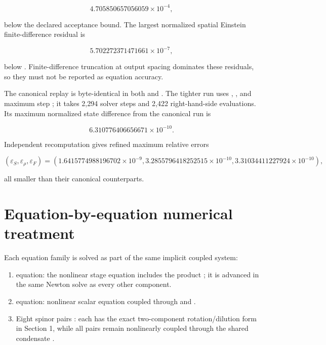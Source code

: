 \documentclass[11pt]{article}
\begin{document}
\[
4.705850657056059\times10^{-4},
\]

below the declared \texttt{} acceptance bound. The largest normalized spatial Einstein finite-difference residual is

\[
5.702272371471661\times10^{-7},
\]

below \texttt{}. Finite-difference truncation at output spacing \texttt{} dominates these residuals, so they must not be reported as \texttt{} equation accuracy.

The canonical replay is byte-identical in both \texttt{} and \texttt{}. The tighter run uses \texttt{}, \texttt{}, and maximum step \texttt{}; it takes 2,294 solver steps and 2,422 right-hand-side evaluations. Its maximum normalized state difference from the canonical run is

\[
6.310776406656671\times10^{-10}.
\]

Independent recomputation gives refined maximum relative errors

\[
(\varepsilon_S,\varepsilon_\rho,\varepsilon_F)
=(1.6415774988196702\times10^{-9},
3.2855796418252515\times10^{-10},
3.31034411227924\times10^{-10}),
\]

all smaller than their canonical counterparts.

\section{Equation-by-equation numerical treatment}

Each equation family is solved as part of the same implicit coupled system:

\begin{enumerate}
\item \texttt{} equation:
the nonlinear stage equation includes the product \texttt{}; it is advanced in the same Newton solve as every other component.

\item \texttt{} equation:
nonlinear scalar equation coupled through \texttt{} and \texttt{}.

\item Eight spinor pairs \texttt{}:
each has the exact two-component rotation/dilution form in Section 1, while all pairs remain nonlinearly coupled through the shared condensate \texttt{}.

\end{enumerate}
\end{document}
